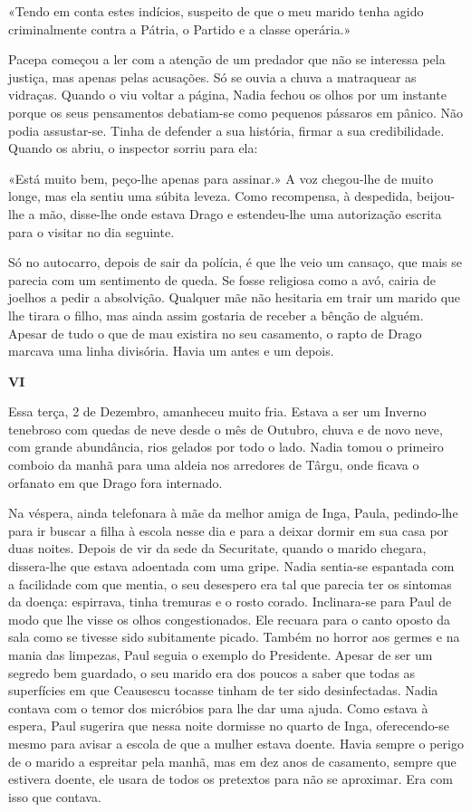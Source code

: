 «Tendo em conta estes indícios, suspeito de que o meu marido tenha agido
criminalmente contra a Pátria, o Partido e a classe operária.»

Pacepa começou a ler com a atenção de um predador que não se interessa
pela justiça, mas apenas pelas acusações. Só se ouvia a chuva a
matraquear as vidraças. Quando o viu voltar a página, Nadia fechou os
olhos por um instante porque os seus pensamentos debatiam-se como
pequenos pássaros em pânico. Não podia assustar-se. Tinha de defender a sua história, firmar a sua credibilidade.
Quando os abriu, o inspector sorriu para ela:

«Está muito bem, peço-lhe apenas para assinar.» A voz chegou-lhe de
muito longe, mas ela sentiu uma súbita leveza. Como recompensa, à
despedida, beijou-lhe a mão, disse-lhe onde estava Drago e estendeu-lhe
uma autorização escrita para o visitar no dia seguinte.

Só no autocarro, depois de sair da polícia, é que lhe veio um cansaço,
que mais se parecia com um sentimento de queda. Se fosse religiosa como
a avó, cairia de joelhos
a pedir a absolvição. Qualquer mãe não hesitaria em trair um marido que
lhe tirara o filho, mas ainda assim gostaria de receber a bênção de
alguém. Apesar de tudo o que de mau existira no seu casamento, o rapto
de Drago marcava uma linha divisória. Havia um antes e um depois.

\pagebreak
\vspace*{1.8cm}
\noindent{}\textbf{VI}

\bigskip

Essa terça, 2 de Dezembro, amanheceu muito fria. Estava a ser um Inverno
tenebroso com quedas de neve desde o mês de Outubro, chuva e de novo
neve, com grande abundância, rios gelados por todo o lado. Nadia tomou o
primeiro comboio da manhã para uma aldeia nos arredores de Târgu, onde
ficava o orfanato em que Drago fora internado.

Na véspera, ainda telefonara à mãe da melhor amiga de Inga, Paula,
pedindo-lhe para ir buscar a filha à escola nesse dia e para a deixar
dormir em sua casa por duas noites. Depois de vir da sede da Securitate,
quando o marido chegara, dissera-lhe que estava adoentada com uma gripe.
Nadia sentia-se espantada com a facilidade com que mentia, o seu
desespero era tal que parecia ter os sintomas da doença: espirrava,
tinha tremuras e o rosto corado. Inclinara-se para Paul de modo que lhe
visse os olhos congestionados. Ele recuara para o canto oposto da sala
como se tivesse sido subitamente picado. Também no horror aos germes e
na mania das limpezas, Paul seguia o exemplo do Presidente. Apesar de
ser um segredo bem
guardado, o seu marido era dos poucos a saber que todas as superfícies
em que Ceausescu tocasse tinham de ter sido desinfectadas. Nadia contava
com o temor dos micróbios para lhe dar uma ajuda. Como estava à espera,
Paul sugerira que nessa noite dormisse no quarto de Inga, oferecendo-se mesmo para avisar a escola de que a mulher estava doente. Havia
sempre o perigo de o marido a espreitar pela manhã, mas em dez anos de
casamento, sempre que estivera doente, ele usara de todos os pretextos
para não se aproximar. Era com isso que contava.

